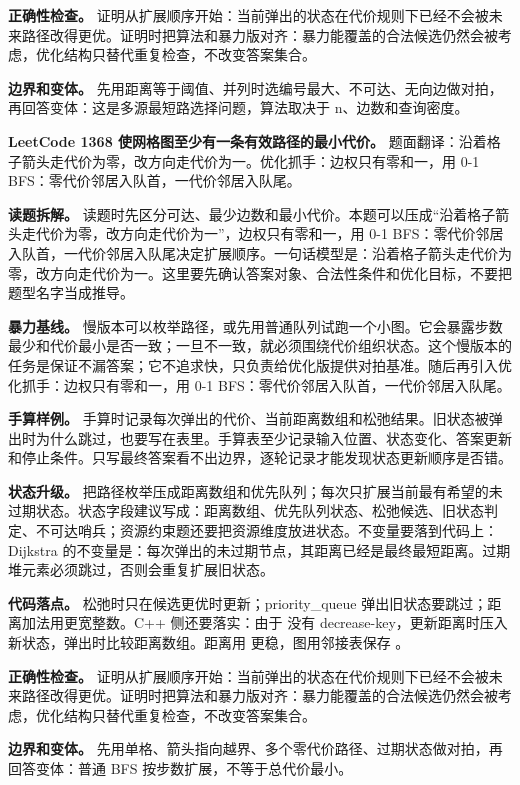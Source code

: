 \textbf{正确性检查。} 证明从扩展顺序开始：当前弹出的状态在代价规则下已经不会被未来路径改得更优。证明时把算法和暴力版对齐：暴力能覆盖的合法候选仍然会被考虑，优化结构只替代重复检查，不改变答案集合。

\textbf{边界和变体。} 先用距离等于阈值、并列时选编号最大、不可达、无向边做对拍，再回答变体：这是多源最短路选择问题，算法取决于 n、边数和查询密度。

\noindent\textbf{LeetCode 1368 使网格图至少有一条有效路径的最小代价。} 题面翻译：沿着格子箭头走代价为零，改方向走代价为一。优化抓手：边权只有零和一，用 0-1 BFS：零代价邻居入队首，一代价邻居入队尾。

\textbf{读题拆解。} 读题时先区分可达、最少边数和最小代价。本题可以压成“沿着格子箭头走代价为零，改方向走代价为一”，边权只有零和一，用 0-1 BFS：零代价邻居入队首，一代价邻居入队尾决定扩展顺序。一句话模型是：沿着格子箭头走代价为零，改方向走代价为一。这里要先确认答案对象、合法性条件和优化目标，不要把题型名字当成推导。

\textbf{暴力基线。} 慢版本可以枚举路径，或先用普通队列试跑一个小图。它会暴露步数最少和代价最小是否一致；一旦不一致，就必须围绕代价组织状态。这个慢版本的任务是保证不漏答案；它不追求快，只负责给优化版提供对拍基准。随后再引入优化抓手：边权只有零和一，用 0-1 BFS：零代价邻居入队首，一代价邻居入队尾。

\textbf{手算样例。} 手算时记录每次弹出的代价、当前距离数组和松弛结果。旧状态被弹出时为什么跳过，也要写在表里。手算表至少记录输入位置、状态变化、答案更新和停止条件。只写最终答案看不出边界，逐轮记录才能发现状态更新顺序是否错。

\textbf{状态升级。} 把路径枚举压成距离数组和优先队列；每次只扩展当前最有希望的未过期状态。状态字段建议写成：距离数组、优先队列状态、松弛候选、旧状态判定、不可达哨兵；资源约束题还要把资源维度放进状态。不变量要落到代码上：Dijkstra 的不变量是：每次弹出的未过期节点，其距离已经是最终最短距离。过期堆元素必须跳过，否则会重复扩展旧状态。

\textbf{代码落点。} 松弛时只在候选更优时更新；priority\_queue 弹出旧状态要跳过；距离加法用更宽整数。C++ 侧还要落实：由于  没有 decrease-key，更新距离时压入新状态，弹出时比较距离数组。距离用  更稳，图用邻接表保存 。

\textbf{正确性检查。} 证明从扩展顺序开始：当前弹出的状态在代价规则下已经不会被未来路径改得更优。证明时把算法和暴力版对齐：暴力能覆盖的合法候选仍然会被考虑，优化结构只替代重复检查，不改变答案集合。

\textbf{边界和变体。} 先用单格、箭头指向越界、多个零代价路径、过期状态做对拍，再回答变体：普通 BFS 按步数扩展，不等于总代价最小。

